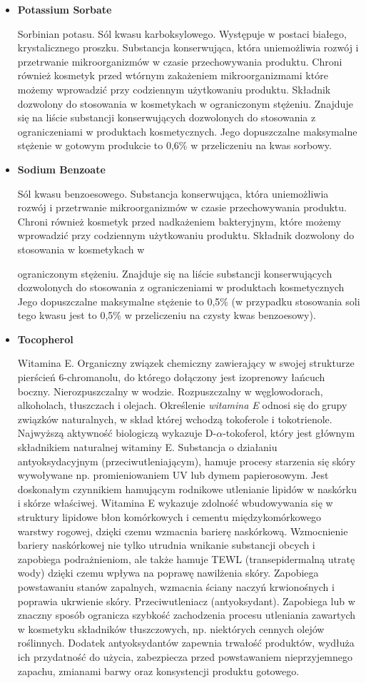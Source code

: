 \begin{itemize}
\item \textbf{Potassium Sorbate}

Sorbinian potasu. Sól kwasu karboksylowego. Występuje w postaci białego, krystalicznego proszku. Substancja konserwująca, która uniemożliwia rozwój i przetrwanie mikroorganizmów w czasie przechowywania produktu. Chroni również kosmetyk przed wtórnym zakażeniem mikroorganizmami które możemy wprowadzić przy codziennym użytkowaniu produktu. Składnik dozwolony do stosowania w kosmetykach w ograniczonym stężeniu. Znajduje się na liście substancji konserwujących dozwolonych do stosowania z ograniczeniami w produktach kosmetycznych. Jego dopuszczalne maksymalne stężenie w gotowym produkcie to 0,6\% w przeliczeniu na kwas sorbowy.

\item \textbf{Sodium Benzoate}

Sól kwasu benzoesowego. Substancja konserwująca, która uniemożliwia rozwój i przetrwanie mikroorganizmów w czasie przechowywania produktu. Chroni również kosmetyk przed nadkażeniem bakteryjnym, które możemy wprowadzić przy codziennym użytkowaniu produktu. Składnik dozwolony do stosowania w kosmetykach w

ograniczonym stężeniu. Znajduje się na liście substancji konserwujących dozwolonych do stosowania z ograniczeniami w produktach kosmetycznych Jego dopuszczalne maksymalne stężenie to 0,5\% (w przypadku stosowania soli tego kwasu jest to 0,5\% w przeliczeniu na czysty kwas benzoesowy).

\item \textbf{Tocopherol}

	Witamina E. Organiczny związek chemiczny zawierający w swojej strukturze pierścień 6-chromanolu, do którego dołączony jest izoprenowy łańcuch boczny. Nierozpuszczalny w wodzie. Rozpuszczalny w węglowodorach, alkoholach, tłuszczach i olejach. Określenie \emph{witamina E} odnosi się do grupy związków naturalnych, w skład której wchodzą tokoferole i tokotrienole. Najwyższą aktywność biologiczą wykazuje D-$\alpha$-tokoferol, który jest głównym składnikiem naturalnej witaminy E. Substancja o działaniu antyoksydacyjnym (przeciwutleniającym), hamuje procesy starzenia się skóry wywoływane np. promieniowaniem UV lub dymem papierosowym. Jest doskonałym czynnikiem hamującym rodnikowe utlenianie lipidów w naskórku i skórze właściwej. Witamina E wykazuje zdolność wbudowywania się w struktury lipidowe błon komórkowych i cementu międzykomórkowego warstwy rogowej, dzięki czemu wzmacnia barierę naskórkową. Wzmocnienie bariery naskórkowej nie tylko utrudnia wnikanie substancji obcych i zapobiega podrażnieniom, ale także hamuje TEWL (transepidermalną utratę wody) dzięki czemu wpływa na poprawę nawilżenia skóry. Zapobiega powstawaniu stanów zapalnych, wzmacnia ściany naczyń krwionośnych i poprawia ukrwienie skóry. Przeciwutleniacz (antyoksydant). Zapobiega lub w znaczny sposób ogranicza szybkość zachodzenia procesu utleniania zawartych w kosmetyku składników tłuszczowych, np. niektórych cennych olejów roślinnych. Dodatek antyoksydantów zapewnia trwałość produktów, wydłuża ich przydatność do użycia, zabezpiecza przed powstawaniem nieprzyjemnego zapachu, zmianami barwy oraz konsystencji produktu gotowego.


\end{itemize}
